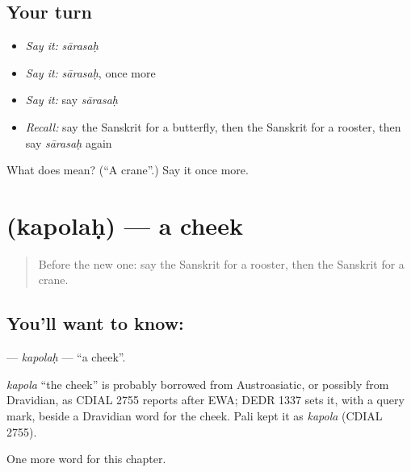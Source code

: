 \subsection*{Your turn}
\begin{itemize}
\raggedright
  \item \emph{Say it:} \emph{sārasaḥ}
  \item \emph{Say it:} \emph{sārasaḥ}, once more
  \item \emph{Say it:} say \emph{sārasaḥ}
  \item \emph{Recall:} say the Sanskrit for a butterfly, then the Sanskrit for a rooster, then say \emph{sārasaḥ} again
\end{itemize}

\begin{tcolorbox}[breakable,colback=teal!4,colframe=teal!35!black,title={Before you move on}]
What does  mean? (\textquotedblleft{}A crane\textquotedblright{}.) Say it once more.
\end{tcolorbox}
\section[\texorpdfstring{\sk{कपोलः} (kapolaḥ)}{कपोलः (kapolaḥ)}]{ (kapolaḥ) — a cheek}

\label{lesson:SA-C116-kapolah}



\begin{quote}
Before the new one: say the Sanskrit for a rooster, then the Sanskrit for a crane.
\end{quote}

\subsection*{You'll want to know: }
\textbf{} — \emph{kapolaḥ} — \textquotedblleft{}a cheek\textquotedblright{}.

\begin{cousinweb}
\emph{kapola} \textquotedblleft{}the cheek\textquotedblright{} is probably borrowed from Austroasiatic, or possibly from Dravidian, as CDIAL 2755 reports after EWA; DEDR 1337 sets it, with a query mark, beside a Dravidian word for the cheek. Pali kept it as \emph{kapola} (CDIAL 2755).
\end{cousinweb}

\begin{grammarlens}[title={What you've built}]
One more word for this chapter.
\end{grammarlens}

